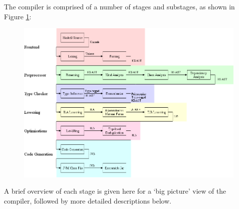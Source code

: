 \documentclass[dissertation.tex]{subfiles}
\begin{document}
The compiler is comprised of a number of stages and substages, as shown in Figure \ref{fig:compiler-layout}:

\begin{figure}[h]
    \includegraphics[width=\textwidth]{figures/compiler_layout.png}
    \caption{}
    \label{fig:compiler-layout}
\end{figure}

A brief overview of each stage is given here for a `big picture' view of the compiler, followed by more detailed
descriptions below.
\end{document}
